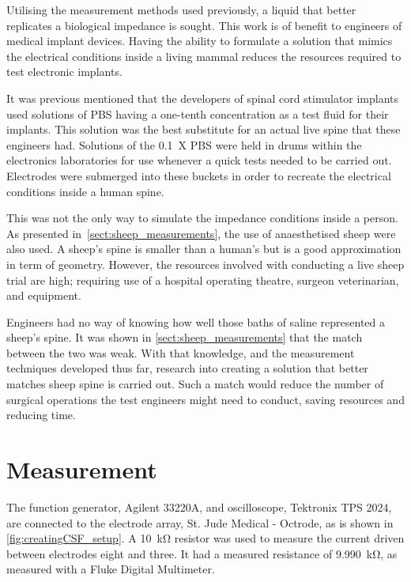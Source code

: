 
Utilising the measurement methods used previously, a liquid that better replicates a biological impedance is sought.
This work is of benefit to engineers of medical implant devices.
Having the ability to formulate a solution that mimics the electrical conditions inside a living mammal reduces the resources required to test electronic implants.

It was previous mentioned that the developers of spinal cord stimulator implants used solutions of PBS having a one-tenth concentration as a test fluid for their implants.
This solution was the best substitute for an actual live spine that these engineers had.
Solutions of the \SI{0.1}{X} PBS were held in drums within the electronics laboratories for use whenever a quick tests needed to be carried out.
Electrodes were submerged into these buckets in order to recreate the electrical conditions inside a human spine.

This was not the only way to simulate the impedance conditions inside a person.
As presented in~\cref{sect:sheep_measurements}, the use of anaesthetised sheep were also used.
A sheep's spine is smaller than a human's but is a good approximation in term of geometry.
However, the resources involved with conducting a live sheep trial are high; requiring use of a hospital operating theatre, surgeon veterinarian, and equipment.

Engineers had no way of knowing how well those baths of saline represented a sheep's spine.
It was shown in \cref{sect:sheep_measurements} that the match between the two was weak.
With that knowledge, and the measurement techniques developed thus far, research into creating a solution that better matches sheep spine is carried out.
Such a match would reduce the number of surgical operations the test engineers might need to conduct, saving resources and reducing time.


\section{Measurement}


  The function generator, Agilent 33220A, and oscilloscope, Tektronix TPS 2024, are connected to the electrode array, St. Jude Medical - Octrode, as is shown in \cref{fig:creatingCSF_setup}.
  A \SI{10}{\kilo\ohm} resistor was used to measure the current driven between electrodes eight and three.
  It had a measured resistance of \SI{9.990}{\kilo\ohm}, as measured with a Fluke Digital Multimeter.

